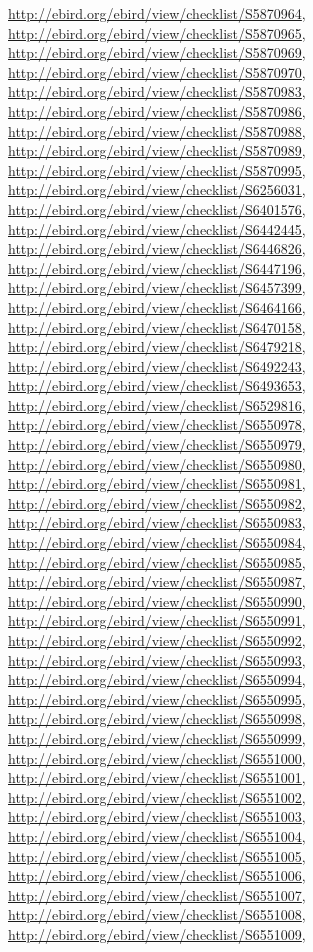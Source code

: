\documentclass[9pt, article]{memoir}
\begin{document}
\begin{multicols}{2}
\url{http://ebird.org/ebird/view/checklist/S5870964}, 
\url{http://ebird.org/ebird/view/checklist/S5870965}, 
\url{http://ebird.org/ebird/view/checklist/S5870969}, 
\url{http://ebird.org/ebird/view/checklist/S5870970}, 
\url{http://ebird.org/ebird/view/checklist/S5870983}, 
\url{http://ebird.org/ebird/view/checklist/S5870986}, 
\url{http://ebird.org/ebird/view/checklist/S5870988}, 
\url{http://ebird.org/ebird/view/checklist/S5870989}, 
\url{http://ebird.org/ebird/view/checklist/S5870995}, 
\url{http://ebird.org/ebird/view/checklist/S6256031}, 
\url{http://ebird.org/ebird/view/checklist/S6401576}, 
\url{http://ebird.org/ebird/view/checklist/S6442445}, 
\url{http://ebird.org/ebird/view/checklist/S6446826}, 
\url{http://ebird.org/ebird/view/checklist/S6447196}, 
\url{http://ebird.org/ebird/view/checklist/S6457399}, 
\url{http://ebird.org/ebird/view/checklist/S6464166}, 
\url{http://ebird.org/ebird/view/checklist/S6470158}, 
\url{http://ebird.org/ebird/view/checklist/S6479218}, 
\url{http://ebird.org/ebird/view/checklist/S6492243}, 
\url{http://ebird.org/ebird/view/checklist/S6493653}, 
\url{http://ebird.org/ebird/view/checklist/S6529816}, 
\url{http://ebird.org/ebird/view/checklist/S6550978}, 
\url{http://ebird.org/ebird/view/checklist/S6550979}, 
\url{http://ebird.org/ebird/view/checklist/S6550980}, 
\url{http://ebird.org/ebird/view/checklist/S6550981}, 
\url{http://ebird.org/ebird/view/checklist/S6550982}, 
\url{http://ebird.org/ebird/view/checklist/S6550983}, 
\url{http://ebird.org/ebird/view/checklist/S6550984}, 
\url{http://ebird.org/ebird/view/checklist/S6550985}, 
\url{http://ebird.org/ebird/view/checklist/S6550987}, 
\url{http://ebird.org/ebird/view/checklist/S6550990}, 
\url{http://ebird.org/ebird/view/checklist/S6550991}, 
\url{http://ebird.org/ebird/view/checklist/S6550992}, 
\url{http://ebird.org/ebird/view/checklist/S6550993}, 
\url{http://ebird.org/ebird/view/checklist/S6550994}, 
\url{http://ebird.org/ebird/view/checklist/S6550995}, 
\url{http://ebird.org/ebird/view/checklist/S6550998}, 
\url{http://ebird.org/ebird/view/checklist/S6550999}, 
\url{http://ebird.org/ebird/view/checklist/S6551000}, 
\url{http://ebird.org/ebird/view/checklist/S6551001}, 
\url{http://ebird.org/ebird/view/checklist/S6551002}, 
\url{http://ebird.org/ebird/view/checklist/S6551003}, 
\url{http://ebird.org/ebird/view/checklist/S6551004}, 
\url{http://ebird.org/ebird/view/checklist/S6551005}, 
\url{http://ebird.org/ebird/view/checklist/S6551006}, 
\url{http://ebird.org/ebird/view/checklist/S6551007}, 
\url{http://ebird.org/ebird/view/checklist/S6551008}, 
\url{http://ebird.org/ebird/view/checklist/S6551009}, 

\end{multicols}
\end{document}
